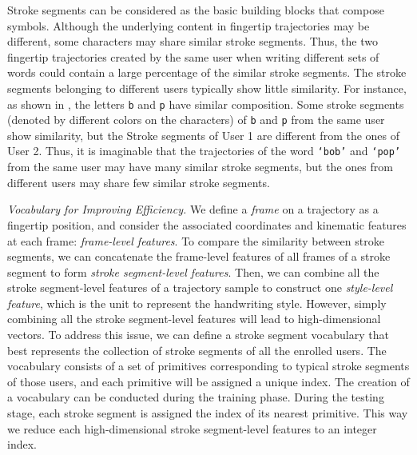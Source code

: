 Stroke segments can be considered as the basic building blocks that compose symbols. Although the underlying content in fingertip trajectories may be different, some characters may share similar stroke segments. Thus, the two fingertip trajectories created by the same user when writing different sets of words could contain a large percentage of the similar stroke segments. The stroke segments belonging to different users typically show little similarity.  For instance,  as shown in , the letters \texttt{b} and \texttt{p} have similar composition.
Some stroke segments (denoted by different colors on the characters) of \texttt{b} and \texttt{p} from the same user show similarity, but the Stroke segments of User 1 are different from the ones of User 2. Thus, it is imaginable that the trajectories of the word \texttt{`bob'} and \texttt{`pop'} from the same user may have many similar stroke segments, but the ones from different users may share few similar stroke segments.


\emph{Vocabulary for Improving Efficiency.}
We define a \textit{frame} on a trajectory as a fingertip position, and consider the associated coordinates and kinematic features at each frame: \textit{frame-level features}. To compare the similarity between stroke segments, we can concatenate the frame-level features of all frames of a stroke segment to form \textit{stroke segment-level features}. Then,
we can combine all the stroke segment-level features of a trajectory sample to construct one \textit{style-level feature}, which is the unit to represent the handwriting style.  However, simply combining all the stroke segment-level features will lead to high-dimensional vectors. %
To address this issue, we can define a stroke segment vocabulary that best represents the collection of stroke segments of all the enrolled users. The vocabulary consists of a set of primitives corresponding to typical stroke segments of those users, and each primitive will be assigned a unique index. The creation of a vocabulary can be conducted during the training phase. During the testing stage, each stroke segment is assigned the index of its nearest primitive. This way we reduce each high-dimensional stroke segment-level features to an integer index. 


